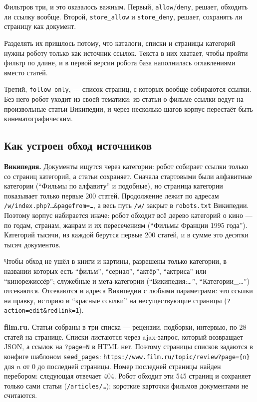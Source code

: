 Фильтров три, и это оказалось важным. Первый, \texttt{allow}/\texttt{deny},
решает, обходить ли ссылку вообще. Второй, \texttt{store\_allow} и
\texttt{store\_deny}, решает, сохранять ли страницу как документ.

Разделять их пришлось потому, что каталоги, списки и страницы категорий нужны
роботу только как источник ссылок. Текста в них хватает, чтобы пройти фильтр по
длине, и в первой версии робота база наполнилась оглавлениями вместо статей.

Третий, \texttt{follow\_only}, --- список страниц, с которых вообще собираются
ссылки. Без него робот уходит из своей тематики: из статьи о фильме ссылки
ведут на произвольные статьи Википедии, и через несколько шагов корпус
перестаёт быть кинематографическим.

\subsection*{Как устроен обход источников}

\textbf{Википедия.} Документы ищутся через категории: робот собирает ссылки
только со страниц категорий, а статьи сохраняет. Сначала стартовыми были
алфавитные категории (\enquote{Фильмы по алфавиту} и подобные), но страница
категории показывает только первые 200 статей. Продолжение лежит по адресам
\texttt{/w/index.php?\ldots\&pagefrom=\ldots}, а весь путь \texttt{/w/}
закрыт в \texttt{robots.txt} Википедии. Поэтому корпус набирается иначе: робот
обходит всё дерево категорий о кино --- по годам, странам, жанрам и их
пересечениям (\enquote{Фильмы Франции 1995 года}). Категорий тысячи, из каждой
берутся первые 200 статей, и в сумме это десятки тысяч документов.

Чтобы обход не ушёл в книги и картины, разрешены только категории, в названии
которых есть \enquote{фильм}, \enquote{сериал}, \enquote{актёр},
\enquote{актриса} или \enquote{кинорежиссёр}; служебные и мета-категории
(\enquote{Википедия:\ldots}, \enquote{Категории\_\ldots}) отсекаются. Отсекаются
и адреса Википедии с любыми параметрами: это ссылки на правку, историю и
\enquote{красные ссылки} на несуществующие страницы (\texttt{?action=edit\&redlink=1}).

\textbf{film.ru.} Статьи собраны в три списка --- рецензии, подборки, интервью,
по 28 статей на странице. Списки листаются через ajax-запрос, который
возвращает JSON, а ссылок на \texttt{?page=N} в HTML нет. Поэтому страницы
списков задаются в конфиге шаблоном \texttt{seed\_pages}:
\texttt{https://www.film.ru/topic/review?page=\{n\}} для $n$ от 0 до последней
страницы. Номер последней страницы найден перебором: следующая отвечает 404.
Робот обходит эти 545 страниц и сохраняет только сами статьи
(\texttt{/articles/\ldots}); короткие карточки фильмов документами не считаются.

\pagebreak

